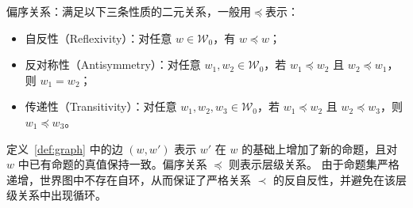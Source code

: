 \begin{remark}
    偏序关系：满足以下三条性质的二元关系，一般用$\preceq$表示：
    \begin{itemize}
        \item 自反性（Reflexivity）：对任意 $w\in\mathcal{W}_0$，有 $w\preceq w$；
        \item 反对称性（Antisymmetry）：对任意 $w_1,w_2\in\mathcal{W}_0$，若 $w_1\preceq w_2$ 且 $w_2\preceq w_1$，则 $w_1=w_2$；
        \item 传递性（Transitivity）：对任意 $w_1,w_2,w_3\in\mathcal{W}_0$，若 $w_1\preceq w_2$ 且 $w_2\preceq w_3$，则 $w_1\preceq w_3$。
    \end{itemize}
\end{remark}

\begin{remark}
    定义~\ref{def:graph} 中的边 $(w,w')$ 表示 $w'$ 在 $w$ 的基础上增加了新的命题，且对 $w$ 中已有命题的真值保持一致。偏序关系 $\preceq$ 则表示层级关系。
    由于命题集严格递增，世界图中不存在自环，从而保证了严格关系 $\prec$ 的反自反性，并避免在该层级关系中出现循环。
\end{remark}

